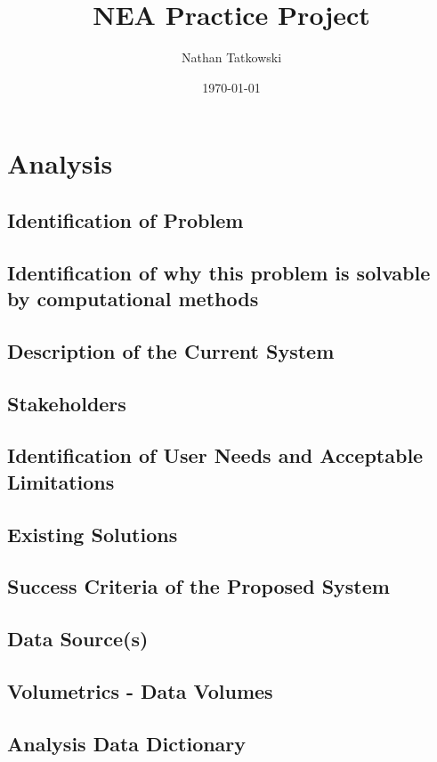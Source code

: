 \documentclass[11pt]{article}
\title{NEA Practice Project}
\author{Nathan Tatkowski}
\date{\today}
\begin{document}
    \pagestyle{fancy}
    \setlength{\headheight}{13.6pt}
    \maketitle
    \pagebreak
    \tableofcontents
    \pagebreak


    \section{Analysis}
        \subsection{Identification of Problem}
        \subsection{Identification of why this problem is solvable by computational methods}
        \subsection{Description of the Current System}
        \subsection{Stakeholders}
        \subsection{Identification of User Needs and Acceptable Limitations}
        \subsection{Existing Solutions}
        \subsection{Success Criteria of the Proposed System}
        \subsection{Data Source(s)}
        \subsection{Volumetrics - Data Volumes}
        \subsection{Analysis Data Dictionary}
\end{document}
